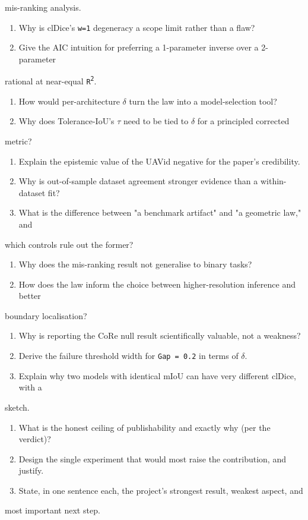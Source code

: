 \documentclass[11pt]{article}
\begin{document}
    mis-ranking analysis.
\begin{enumerate}\setlength{\itemsep}{1pt}
\item Why is clDice's \texttt{w=1} degeneracy a scope limit rather than a flaw?
\item Give the AIC intuition for preferring a 1-parameter inverse over a 2-parameter
\end{enumerate}
    rational at near-equal \texttt{R\textsuperscript{2}}.
\begin{enumerate}\setlength{\itemsep}{1pt}
\item How would per-architecture \texttt{$\delta$} turn the law into a model-selection tool?
\item Why does Tolerance-IoU's \texttt{$\tau$} need to be tied to \texttt{$\delta$} for a principled corrected
\end{enumerate}
    metric?
\begin{enumerate}\setlength{\itemsep}{1pt}
\item Explain the epistemic value of the UAVid negative for the paper's credibility.
\item Why is out-of-sample dataset agreement stronger evidence than a within-dataset fit?
\item What is the difference between "a benchmark artifact" and "a geometric law," and
\end{enumerate}
    which controls rule out the former?
\begin{enumerate}\setlength{\itemsep}{1pt}
\item Why does the mis-ranking result not generalise to binary tasks?
\item How does the law inform the choice between higher-resolution inference and better
\end{enumerate}
    boundary localisation?
\begin{enumerate}\setlength{\itemsep}{1pt}
\item Why is reporting the CoRe null result scientifically valuable, not a weakness?
\item Derive the failure threshold width for \texttt{Gap = 0.2} in terms of \texttt{$\delta$}.
\item Explain why two models with identical mIoU can have very different clDice, with a
\end{enumerate}
    sketch.
\begin{enumerate}\setlength{\itemsep}{1pt}
\item What is the honest ceiling of publishability and exactly why (per the verdict)?
\item Design the single experiment that would most raise the contribution, and justify.
\item State, in one sentence each, the project's strongest result, weakest aspect, and
\end{enumerate}
    most important next step.
\end{document}
